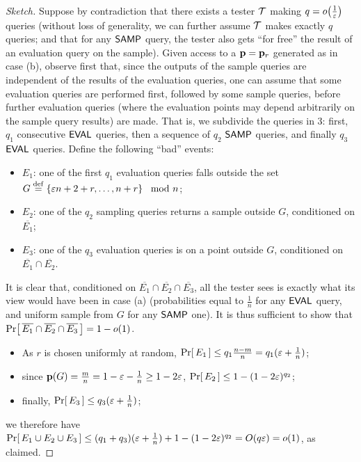 \begin{proof}[Sketch]
Suppose by contradiction that there exists a tester $\mathcal{T}$ making $q=\littleO{\frac{1}{\eps}}$ queries (without loss of generality, we can further assume $\mathcal{T}$ makes exactly $q$ queries; and that for any ${\sf SAMP}$ query, the tester also gets ``for free'' the result of an evaluation query on the sample). Given \pdfsamp access to a $\mathbf{p}=\mathbf{p}_r$ generated as in case \textsf{(b)}, observe first that, since the outputs of the sample queries are independent of the results of the evaluation queries, one can assume that some evaluation queries are performed first, followed by some sample queries, before further evaluation queries (where the evaluation points may depend arbitrarily on the sample query results) are made. That is, we subdivide the queries in 3: first, $q_1$ consecutive ${\sf EVAL}$ queries, then a sequence of $q_2$ ${\sf SAMP}$ queries, and finally $q_3$ ${\sf EVAL}$ queries. Define the following ``bad'' events:
\begin{itemize}
  \item $E_1$: one of the first $q_1$ evaluation queries falls outside the set $G\stackrel{\rm def}{=}\left\{\varepsilon n+2+r, \dots, n+r\right\} \mod n$;
  \item $E_2$: one of the $q_2$ sampling queries returns a sample outside $G$, conditioned on $\overline{E_1}$; 
  \item $E_3$: one of the $q_3$ evaluation queries is on a point outside $G$, conditioned on $\overline{E_1}\cap\overline{E_2}$.
\end{itemize}
It is clear that, conditioned on $\overline{E_1}\cap\overline{E_2}\cap\overline{E_3}$, all the tester sees is exactly what its view would have been in case \textsf{(a)} (probabilities equal to $\frac{1}{n}$ for any ${\sf EVAL}$ query, and uniform sample from $G$ for any ${\sf SAMP}$ one). It is thus sufficient to show that $\probaOf{ \overline{E_1}\cap\overline{E_2}\cap\overline{E_3} } = 1-\littleO{1}$.
\begin{itemize}
  \item As $r$ is chosen uniformly at random, $\Pr\!\left[\,  E_1 \, \right] \leq q_1\frac{n-m}{n}=q_1(\varepsilon+\frac{1}{n})$;
  \item since $\mathbf{p}(G)=\frac{m}{n} = 1-\varepsilon -\frac{1}{n} \geq 1-2\varepsilon$, $\Pr\!\left[\,  E_2 \, \right] \leq 1 - (1-2\varepsilon)^{q_2}$;
  \item finally, $\Pr\!\left[\,  E_3 \, \right] \leq q_3(\varepsilon+\frac{1}{n})$;
\end{itemize}
we therefore have $\probaOf{ E_1 \cup E_2\cup E_3 } \leq (q_1+q_3)(\eps+\frac{1}{n}) + 1 - (1-2\eps)^{q_2} = \bigO{q\eps} = \littleO{1}$, as claimed.
\end{proof}
